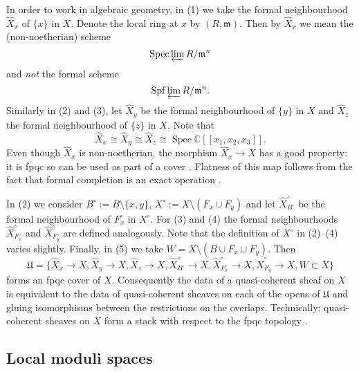 \documentclass{amsart}
\theoremstyle{definition}
\newcommand{\CC} {\mathbb{C}}          %
\newcommand{\Spec}{\operatorname{Spec}}
\begin{document}
In order to work in algebraic geometry, in (1) we take the formal neighbourhood $\widehat{X}_x$ of $\{x\}$ in $X$. Denote the local ring at $x$ by $(R,\mathfrak{m})$. Then by $\widehat{X}_x$ we mean the (non-noetherian) scheme
$$
\Spec \varprojlim R / \mathfrak{m}^n 
$$
and \emph{not} the formal scheme $$\mathrm{Spf} \varprojlim R / \mathfrak{m}^n.$$ Similarly in (2) and (3), let $\widehat{X}_y$ be the formal neighbourhood of $\{y\}$ in $X$ and $\widehat{X}_z$ the formal neighbourhood of $\{z\}$ in $X$. Note that 
$$
\widehat{X}_x \cong \widehat{X}_y \cong \widehat{X}_z \cong\Spec \CC[\![x_1,x_2,x_3]\!].
$$
Even though $\widehat{X}_x$ is non-noetherian, the morphism $\widehat{X}_x \rightarrow X$ has a good property: it is fpqc so can be used as part of a cover \cite[Sect.~2.3.2]{Vis}. Flatness of this map follows from the fact that formal completion is an exact operation \cite[Prop.~10.12, 10.13]{AM}. 

In (2) we consider $B^\circ := B \setminus \{x,y\}$, $X^\circ := X \setminus (F_x  \cup F_y)$ and let $\widehat{X}^{\circ}_{B^\circ}$ be the formal neighbourhood of $F_{x}^{\circ}$ in $X^\circ$. For (3) and (4) the formal neighbourhoods $\widehat{X}^{\circ}_{F_{x}^{\circ}}$ and $\widehat{X}^{\circ}_{F_{y}^{\circ}}$ are defined analogously. Note that the definition of $X^\circ$ in (2)--(4) varies slightly. Finally, in (5) we take $W = X \setminus (B \cup F_x \cup F_y)$. Then
$$
\mathfrak{U} = \{\widehat{X}_x \rightarrow X, \widehat{X}_y \rightarrow X, \widehat{X}_z \rightarrow X, \widehat{X}^{\circ}_{B^\circ} \rightarrow X, \widehat{X}^{\circ}_{F_{x}^{\circ}} \rightarrow X, \widehat{X}^{\circ}_{F_{y}^{\circ}} \rightarrow X, W \subset X\}
$$
forms an fpqc cover of $X$. Consequently the data of a quasi-coherent sheaf on $X$ is equivalent to the data of quasi-coherent sheaves on each of the opens of $\mathfrak{U}$ and gluing isomorphisms between the restrictions on the overlaps. Technically: quasi-coherent sheaves on $X$ form a stack with respect to the fpqc topology \cite[Thm.~4.23]{Vis}.


\subsection{Local moduli spaces} \label{localmod}
\end{document}
